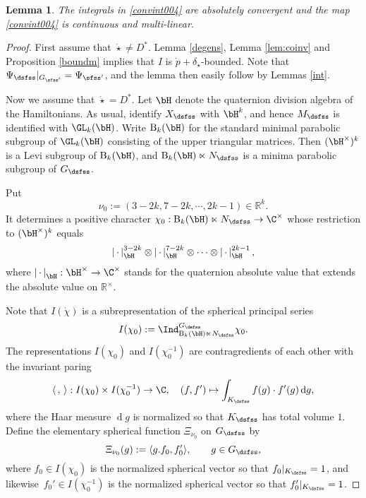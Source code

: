 \documentclass[12pt,a4paper]{amsart}
\def\abs#1{\left|{#1}\right|}
\newcommand{\od}{\operatorname{d}}
\newcommand{\R}{\mathbb R}
\newcommand{\la}{\langle}
\newcommand{\ra}{\rangle}
\numberwithin{equation}{section}
\newtheorem{lem}[thm]{Lemma}
\theoremstyle{remark}
\begin{document}
\begin{lem}\label{intpi004}
The integrals in \eqref{convint004} are absolutely convergent and the map \eqref{convint004} is   continuous and multi-linear.
\end{lem}
\begin{proof}
 First assume that $\dot \star\neq D^*$. Lemma \ref{degens}, Lemma \ref{lem:coinv} and  Proposition \ref{boundm} implies that  $I$ is $\dot p+\delta_{\dot \star}$-bounded.
 Note that ${\Psi_\dsfss}|_{G_{\sfss'}}=\Psi_{\sfss'}$, and the lemma then easily follow by Lemmas \ref{int}.



 Now we  assume that $\dot \star= D^*$. Let $\bH$ denote the quaternion division algebra of the Hamiltonians. As usual,  identify $X_\dsfss$ with $\bH^k$,  and hence $M_{\dsfss}$ is identified with $\GL_k(\bH)$. Write $\mathrm{B}_k(\bH)$ for the standard minimal parabolic subgroup of $\GL_k(\bH)$ consisting of the upper triangular matrices. Then $(\bH^\times)^k$ is a Levi subgroup of $\mathrm{B}_k(\bH)$, and $\mathrm{B}_k(\bH)\ltimes N_{\dsfss}$ is a minima parabolic subgroup of $G_{\dsfss}$.

 Put
 \[
   \nu_0:=(3-2k, 7-2k, \cdots, 2k-1)\in \R^k.
 \]
 It determines a positive character $\chi_0: \mathrm{B}_k(\bH)\ltimes N_{\dsfss}\rightarrow \C^\times $ whose restriction to $(\bH^\times)^k$ equals
 \[
    \abs{\, \cdot\, }_\bH^{3-2k}\otimes  \abs{\, \cdot\, }_\bH^{7-2k}\otimes \cdots \otimes  \abs{\, \cdot\, }_\bH^{2k-1},
 \]
 where  $\abs{\, \cdot\, }_\bH: \bH^\times \rightarrow \C^\times $ stands for the quaternion absolute value that extends the absolute value on $\R^\times $.

 Note that $I(\dot{\chi})$ is a subrepresentation of the spherical principal series
 \[
  I(\chi_0):= \Ind_{\mathrm{B}_k(\bH)\ltimes N_{\dsfss}}^{G_{\dsfss}} \chi_0.
 \]
 The representations
 $I(\chi_0)$ and $I(\chi_0^{-1})$ are contragredients of each other with the invariant paring
 \[
  \la\,,\,\ra:  I(\chi_0)\times I(\chi_0^{-1})\rightarrow \C, \quad (f, f')\mapsto \int_{K_\dsfss} f(g) \cdot f'(g) \od\!g,
 \]
 where the Haar measure $\od\!g$ is normalized so that $K_\dsfss$ has total volume $1$.  Define the elementary spherical function $ \Xi_{\nu_0}$ on $G_\dsfss$ by
 \[
    \Xi_{\nu_0}(g):=\la g.f_0, f_0'\ra,\qquad g\in G_\dsfss,
    \]
 where $f_0\in I(\chi_0)$ is the normalized spherical vector so that ${f_0}|_{K_\dsfss}=1$, and likewise $\, f_0'\in I(\chi_0^{-1})$ is the normalized spherical vector so that  ${f_0'}|_{K_\dsfss}=1$.



\end{proof}
\end{document}
